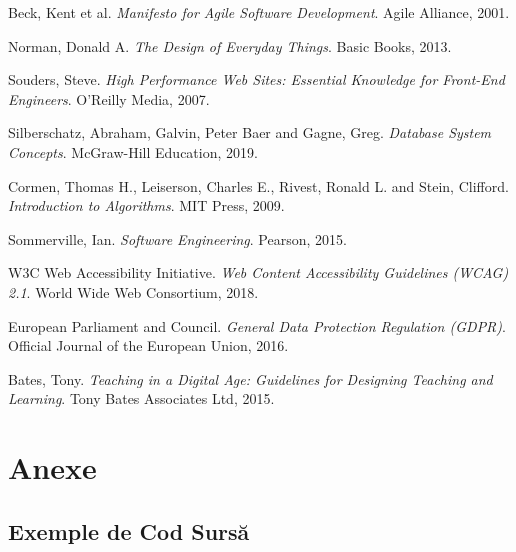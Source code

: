 \documentclass[12pt,a4paper]{report}
\begin{document}
\begin{thebibliography}{20}
Beck, Kent et al. 
\textit{Manifesto for Agile Software Development}. 
Agile Alliance, 2001.

Norman, Donald A. 
\textit{The Design of Everyday Things}. 
Basic Books, 2013.

Souders, Steve. 
\textit{High Performance Web Sites: Essential Knowledge for Front-End Engineers}. 
O'Reilly Media, 2007.

Silberschatz, Abraham, Galvin, Peter Baer and Gagne, Greg. 
\textit{Database System Concepts}. 
McGraw-Hill Education, 2019.

Cormen, Thomas H., Leiserson, Charles E., Rivest, Ronald L. and Stein, Clifford. 
\textit{Introduction to Algorithms}. 
MIT Press, 2009.

Sommerville, Ian. 
\textit{Software Engineering}. 
Pearson, 2015.

W3C Web Accessibility Initiative. 
\textit{Web Content Accessibility Guidelines (WCAG) 2.1}. 
World Wide Web Consortium, 2018.

European Parliament and Council. 
\textit{General Data Protection Regulation (GDPR)}. 
Official Journal of the European Union, 2016.

Bates, Tony. 
\textit{Teaching in a Digital Age: Guidelines for Designing Teaching and Learning}. 
Tony Bates Associates Ltd, 2015.

\end{thebibliography}

\appendix

\chapter{Anexe}

\section{Exemple de Cod Sursă}
\end{document}
